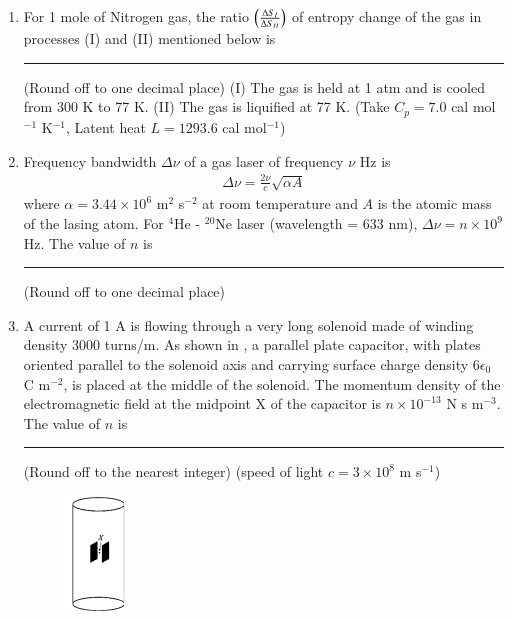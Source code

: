 \documentclass[journal,12pt,onecolumn]{IEEEtran}
\theoremstyle{remark}
\begin{document}
\begin{enumerate}
\item
For 1 mole of Nitrogen gas, the ratio $\left( \frac{\Delta S_{I}}{\Delta S_{II}} \right)$ of entropy change of the gas in processes (I) and (II) mentioned below is \rule{1cm}{0.4pt} (Round off to one decimal place)
(I) The gas is held at 1 atm and is cooled from 300 K to 77 K.
(II) The gas is liquified at 77 K.
(Take $C_p = 7.0$ cal mol$^{-1}$ K$^{-1}$, Latent heat $L = 1293.6$ cal mol$^{-1}$)


\item
Frequency bandwidth $\Delta\nu$ of a gas laser of frequency $\nu$ Hz is \begin{align*}\Delta\nu = \frac{2\nu}{c}\sqrt{\alpha A}\end{align*} where $\alpha = 3.44 \times 10^6$ m$^2$ s$^{-2}$ at room temperature and $A$ is the atomic mass of the lasing atom. For $^4$He - $^{20}$Ne laser (wavelength = 633 nm), $\Delta\nu = n \times 10^9$ Hz. The value of $n$ is \rule{1cm}{0.4pt} (Round off to one decimal place)


\item
A current of 1 A is flowing through a very long solenoid made of winding density 3000 turns/m. As shown in , a parallel plate capacitor, with plates oriented parallel to the solenoid axis and carrying surface charge density $6\epsilon_0$ C m$^{-2}$, is placed at the middle of the solenoid. The momentum density of the electromagnetic field at the midpoint X of the capacitor is $n \times 10^{-13}$ N s m$^{-3}$. The value of $n$ is \rule{1cm}{0.4pt} (Round off to the nearest integer) (speed of light $c = 3 \times 10^8$ m s$^{-1}$)
    \begin{figure}[H] \centering \caption{} \label{fig:65}\includegraphics{figs/65.png}\end{figure}%


\end{enumerate}
\end{document}
